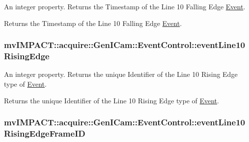 An integer property. Returns the Timestamp of the Line 10 Falling Edge \hyperlink{classmv_i_m_p_a_c_t_1_1acquire_1_1_event}{Event}. 

Returns the Timestamp of the Line 10 Falling Edge \hyperlink{classmv_i_m_p_a_c_t_1_1acquire_1_1_event}{Event}. \hypertarget{classmv_i_m_p_a_c_t_1_1acquire_1_1_gen_i_cam_1_1_event_control_ae3a2db71f9d4bcec3abefb3bf9908e96}{
\subsubsection[{event\+Line10\+Rising\+Edge}]{ mv\+I\+M\+P\+A\+C\+T\+::acquire\+::\+Gen\+I\+Cam\+::\+Event\+Control\+::event\+Line10\+Rising\+Edge}}\label{classmv_i_m_p_a_c_t_1_1acquire_1_1_gen_i_cam_1_1_event_control_ae3a2db71f9d4bcec3abefb3bf9908e96}


An integer property. Returns the unique Identifier of the Line 10 Rising Edge type of \hyperlink{classmv_i_m_p_a_c_t_1_1acquire_1_1_event}{Event}. 

Returns the unique Identifier of the Line 10 Rising Edge type of \hyperlink{classmv_i_m_p_a_c_t_1_1acquire_1_1_event}{Event}. \hypertarget{classmv_i_m_p_a_c_t_1_1acquire_1_1_gen_i_cam_1_1_event_control_a3bf6a9a85f7d9c7ab9ca2fc452a5cbe3}{
\subsubsection[{event\+Line10\+Rising\+Edge\+Frame\+I\+D}]{ mv\+I\+M\+P\+A\+C\+T\+::acquire\+::\+Gen\+I\+Cam\+::\+Event\+Control\+::event\+Line10\+Rising\+Edge\+Frame\+I\+D}}\label{classmv_i_m_p_a_c_t_1_1acquire_1_1_gen_i_cam_1_1_event_control_a3bf6a9a85f7d9c7ab9ca2fc452a5cbe3}


